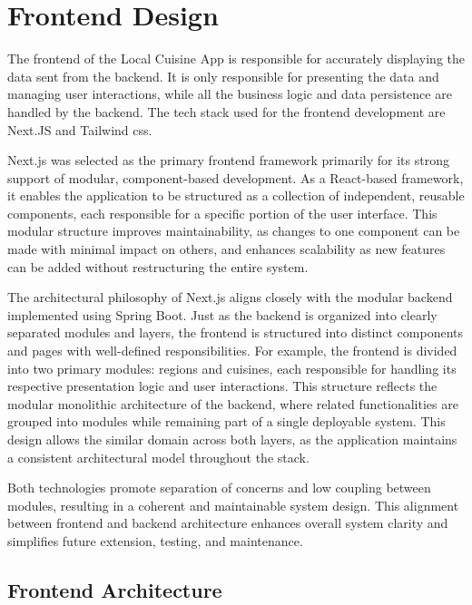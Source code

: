 \clearpage
\section[Frontend Design]{Frontend Design}\label{sec:newsec}
The frontend of the Local Cuisine App is responsible for accurately displaying the data sent from 
the backend. It is only responsible for presenting the data and managing user interactions,
while all the business logic and data persistence are handled by the backend. 
The tech stack used for the frontend development are Next.JS and Tailwind css. 

Next.js was selected as the primary frontend framework primarily for its strong support of modular, component-based development. 
As a React-based framework, it enables the application to be structured as a collection of independent, reusable components, 
each responsible for a specific portion of the user interface. This modular structure improves maintainability, 
as changes to one component can be made with minimal impact on others, and enhances scalability as new features 
can be added without restructuring the entire system.

The architectural philosophy of Next.js aligns closely with the modular backend implemented using Spring Boot. 
Just as the backend is organized into clearly separated modules and layers, 
the frontend is structured into distinct components and pages with well-defined responsibilities. 
For example, the frontend is divided into two primary modules: regions and cuisines, 
each responsible for handling its respective presentation logic and user interactions. 
This structure reflects the modular monolithic architecture of the backend, where related 
functionalities are grouped into modules while remaining part of a single deployable system. 
This design allows the similar domain across both layers, as the application maintains a consistent 
architectural model throughout the stack. 

Both technologies promote separation of concerns and low coupling between modules, 
resulting in a coherent and maintainable system design. 
This alignment between frontend and backend architecture enhances overall system clarity 
and simplifies future extension, testing, and maintenance.

\subsection{Frontend Architecture}

